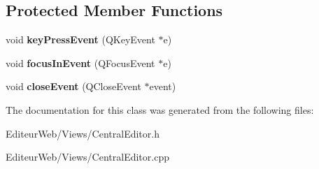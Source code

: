 \subsection*{Protected Member Functions}
\begin{DoxyCompactItemize}
\item 
\hypertarget{class_central_editor_a1d98f7200723a10b959b99bb06031bbb}{
void {\bfseries keyPressEvent} (QKeyEvent $\ast$e)}
\label{class_central_editor_a1d98f7200723a10b959b99bb06031bbb}

\item 
\hypertarget{class_central_editor_a4b518342f44eeed10adb3d99c6f0bc58}{
void {\bfseries focusInEvent} (QFocusEvent $\ast$e)}
\label{class_central_editor_a4b518342f44eeed10adb3d99c6f0bc58}

\item 
\hypertarget{class_central_editor_ad6f73cc12c5199246ace3d0d3c8836c8}{
void {\bfseries closeEvent} (QCloseEvent $\ast$event)}
\label{class_central_editor_ad6f73cc12c5199246ace3d0d3c8836c8}

\end{DoxyCompactItemize}


The documentation for this class was generated from the following files:\begin{DoxyCompactItemize}
\item 
EditeurWeb/Views/CentralEditor.h\item 
EditeurWeb/Views/CentralEditor.cpp\end{DoxyCompactItemize}
